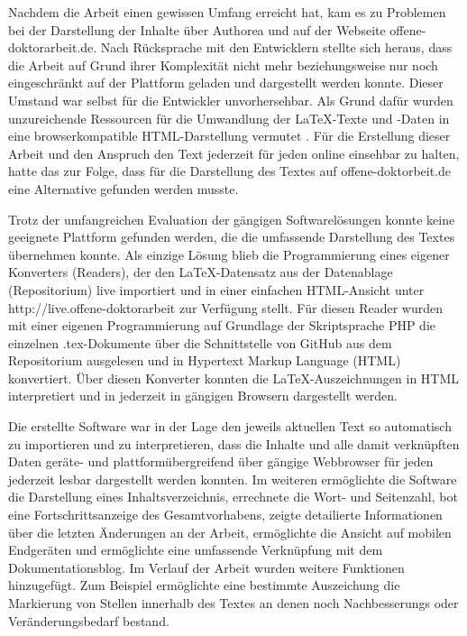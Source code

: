Nachdem die Arbeit einen gewissen Umfang erreicht hat, kam es zu Problemen bei der Darstellung der Inhalte über Authorea und auf der Webseite offene-doktorarbeit.de. Nach Rücksprache mit den Entwicklern stellte sich heraus, dass die Arbeit auf Grund ihrer Komplexität nicht mehr beziehungsweise nur noch eingeschränkt auf der Plattform geladen und dargestellt werden konnte. Dieser Umstand war selbst für die Entwickler unvorhersehbar. Als Grund dafür wurden unzureichende Ressourcen für die Umwandlung der LaTeX-Texte und -Daten in eine browserkompatible HTML-Darstellung vermutet \cite{authorea_502_2014}. Für die Erstellung dieser Arbeit und den Anspruch den Text jederzeit für jeden online einsehbar zu halten, hatte das zur Folge, dass für die Darstellung des Textes auf offene-doktorbeit.de eine Alternative gefunden werden musste.

Trotz der umfangreichen Evaluation der gängigen Softwarelösungen konnte keine geeignete Plattform gefunden werden, die die umfassende Darstellung des Textes übernehmen konnte. Als einzige Lösung blieb die Programmierung eines eigener Konverters (Readers), der den LaTeX-Datensatz aus der Datenablage (Repositorium) live importiert und in einer einfachen HTML-Ansicht unter http://live.offene-doktorarbeit zur Verfügung stellt. Für diesen Reader wurden mit einer eigenen Programmierung auf Grundlage der Skriptsprache PHP die einzelnen .tex-Dokumente über die Schnittstelle von GitHub aus dem Repositorium ausgelesen und in Hypertext Markup Language (HTML) konvertiert. Über diesen Konverter konnten die LaTeX-Auszeichnungen in HTML interpretiert und in jederzeit in gängigen Browsern dargestellt werden.

Die erstellte Software war in der Lage den jeweils aktuellen Text so automatisch zu importieren und zu interpretieren, dass die Inhalte und alle damit verknüpften Daten geräte- und plattformübergreifend über gängige Webbrowser für jeden jederzeit lesbar dargestellt werden konnten. Im weiteren ermöglichte die Software die Darstellung eines Inhaltsverzeichnis, errechnete die Wort- und Seitenzahl, bot eine Fortschrittsanzeige des Gesamtvorhabens, zeigte detailierte Informationen über die letzten Änderungen an der Arbeit, ermöglichte die Ansicht auf mobilen Endgeräten und ermöglichte eine umfassende Verknüpfung mit dem Dokumentationsblog. Im Verlauf der Arbeit wurden weitere Funktionen hinzugefügt. Zum Beispiel ermöglichte eine bestimmte Auszeichung die Markierung von Stellen innerhalb des Textes an denen noch Nachbesserungs oder Veränderungsbedarf bestand.

